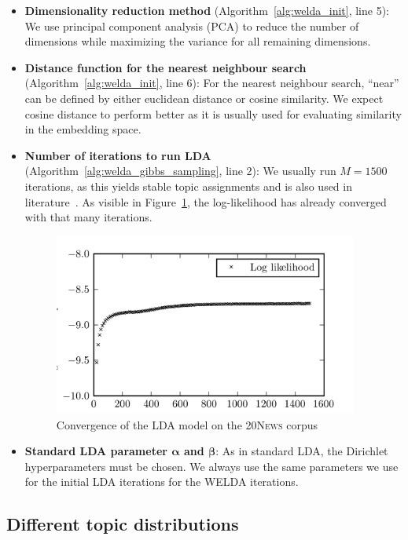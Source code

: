 \documentclass[
        a4paper,
        titlepage,
        twoside,
        parskip
        ]{scrbook}
\theoremstyle{break}
\begin{document}
\begin{itemize}
  \item \textbf{Dimensionality reduction method} (Algorithm~\ref{alg:welda_init}, line 5):
    We use principal component analysis (PCA) to reduce the number of dimensions while maximizing the variance for all remaining dimensions.
  \item \textbf{Distance function for the nearest neighbour search} (Algorithm~\ref{alg:welda_init}, line 6):
    For the nearest neighbour search, ``near'' can be defined by either euclidean distance or cosine similarity.
    We expect cosine distance to perform better as it is usually used for evaluating similarity in the embedding space.
  \item \textbf{Number of iterations to run LDA} (Algorithm~\ref{alg:welda_gibbs_sampling}, line 2):
    We usually run $M = 1500$ iterations, as this yields stable topic assignments and is also used in literature~\cite{Nguyen2015}.
    As visible in Figure~\ref{fig:ll_lda_convergence}, the log-likelihood has already converged with that many iterations.
    \begin{figure}
           \centering
           \includegraphics[width=10cm]{figures/ll_lda_convergence.png}
           \caption{Convergence of the LDA model on the \textsc{20News} corpus}
           \label{fig:ll_lda_convergence}
    \end{figure}
  \item \textbf{Standard LDA parameter $\boldsymbol{\alpha}$ and $\boldsymbol{\beta}$}:
    As in standard LDA, the Dirichlet hyperparameters must be chosen.
    We always use the same parameters we use for the initial LDA iterations for the WELDA iterations.
\end{itemize}

\subsection{Different topic distributions}
\end{document}
